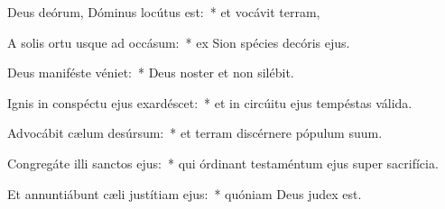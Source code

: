 \item Deus deórum, Dóminus locútus est:~* et vocávit terram,

\item A solis ortu usque ad occásum:~* ex Sion spécies decóris ejus.

\item Deus maniféste véniet:~* Deus noster et non silébit.

\item Ignis in conspéctu ejus exardéscet:~* et in circúitu ejus tempéstas válida.

\item Advocábit cælum desúrsum:~* et terram discérnere pópulum suum.

\item Congregáte illi sanctos ejus:~* qui órdinant testaméntum ejus super sacrifícia.

\item Et annuntiábunt cæli justítiam ejus:~* quóniam Deus judex est.
